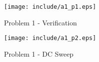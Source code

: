 
\begin{figure}[H]
	\centering
	\texttt{[image: include/a1\_p1.eps]}
	\caption{Problem 1 - Verification}
	\label{fig:a1-p1}
\end{figure}
\begin{framed}
	
\end{framed}

\begin{figure}[H]
	\centering
	\texttt{[image: include/a1\_p2.eps]}
	\caption{Problem 1 - DC Sweep}
	\label{fig:a1-p2}
\end{figure}
\begin{framed}
	
\end{framed}


